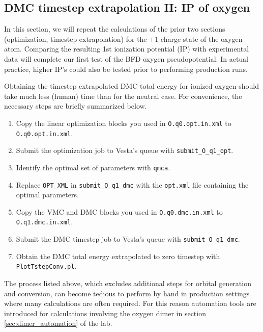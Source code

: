 \subsection{DMC timestep extrapolation II: IP of oxygen}
In this section, we will repeat the calculations of the prior two sections (optimization, timestep extrapolation) for the $+1$ charge state of the oxygen atom.  Comparing the resulting 1st ionization potential (IP) with experimental data will complete our first test of the BFD oxygen pseudopotential.  In actual practice, higher IP's could also be tested prior to performing production runs.

Obtaining the timestep extrapolated DMC total energy for ionized oxygen should take much less (human) time than for the neutral case.  For convenience, the necessary steps are briefly summarized below.
\begin{enumerate}
  \item{Copy the linear optimization blocks you used in \texttt{O.q0.opt.in.xml} to  \texttt{O.q0.opt.in.xml}.}
  \item{Submit the optimization job to Vesta's queue with \texttt{submit\_O\_q1\_opt}}.
  \item{Identify the optimal set of parameters with \texttt{qmca}.}
  \item{Replace \texttt{OPT\_XML} in \texttt{submit\_O\_q1\_dmc} with the \texttt{opt.xml} file containing the optimal parameters.}
  \item{Copy the VMC and DMC blocks you used in \texttt{O.q0.dmc.in.xml} to \texttt{O.q1.dmc.in.xml}.}
  \item{Submit the DMC timestep job to Vesta's queue with \texttt{submit\_O\_q1\_dmc}}.
  \item{Obtain the DMC total energy extrapolated to zero timestep with \texttt{PlotTstepConv.pl}.}
\end{enumerate}
The process listed above, which excludes additional steps for orbital generation and conversion, can become tedious to perform by hand in production settings where many calculations are often required.  For this reason automation tools are introduced for calculations involving the oxygen dimer in section \ref{sec:dimer_automation} of the lab.  

